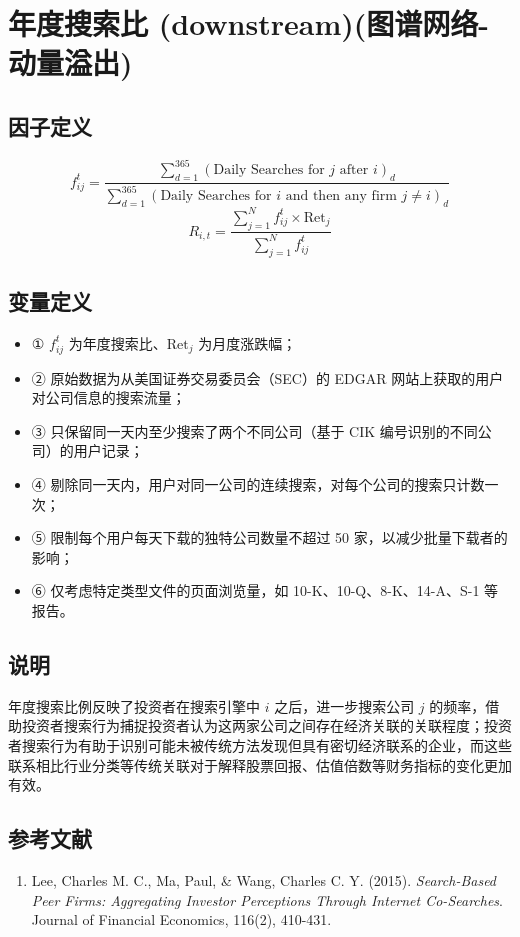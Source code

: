 \documentclass{article}
\begin{document}
\section{年度搜索比 (downstream)(图谱网络-动量溢出)}

\subsection{因子定义}
\begin{equation}
    f_{ij}^t = \frac{\sum_{d=1}^{365} (\text{Daily Searches for } j \text{ after } i)_d}{\sum_{d=1}^{365} (\text{Daily Searches for } i \text{ and then any firm } j \neq i)_d}
\end{equation}
\begin{equation}
    R_{i,t} = \frac{\sum_{j=1}^N f_{ij}^t \times \mathrm{Ret}_j}{\sum_{j=1}^N f_{ij}^t}
\end{equation}

\subsection{变量定义}
\begin{itemize}
    \item ① \( f_{ij}^t \) 为年度搜索比、\( \mathrm{Ret}_j \) 为月度涨跌幅；
    \item ② 原始数据为从美国证券交易委员会（SEC）的 EDGAR 网站上获取的用户对公司信息的搜索流量；
    \item ③ 只保留同一天内至少搜索了两个不同公司（基于 CIK 编号识别的不同公司）的用户记录；
    \item ④ 剔除同一天内，用户对同一公司的连续搜索，对每个公司的搜索只计数一次；
    \item ⑤ 限制每个用户每天下载的独特公司数量不超过 50 家，以减少批量下载者的影响；
    \item ⑥ 仅考虑特定类型文件的页面浏览量，如 10-K、10-Q、8-K、14-A、S-1 等报告。
\end{itemize}

\subsection{说明}
年度搜索比例反映了投资者在搜索引擎中 \( i \) 之后，进一步搜索公司 \( j \) 的频率，借助投资者搜索行为捕捉投资者认为这两家公司之间存在经济关联的关联程度；投资者搜索行为有助于识别可能未被传统方法发现但具有密切经济联系的企业，而这些联系相比行业分类等传统关联对于解释股票回报、估值倍数等财务指标的变化更加有效。

\subsection{参考文献}
\begin{enumerate}
    \item Lee, Charles M. C., Ma, Paul, \& Wang, Charles C. Y. (2015). \textit{Search-Based Peer Firms: Aggregating Investor Perceptions Through Internet Co-Searches}. Journal of Financial Economics, 116(2), 410-431.
\end{enumerate}
\end{document}
